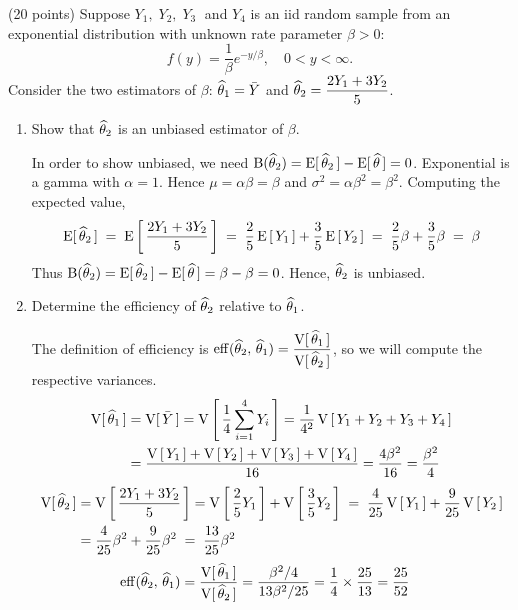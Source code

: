 (20 points) Suppose $Y_1,\; Y_2,\; Y_3\;$ and $Y_4$ is an iid random sample from an exponential distribution with unknown rate parameter $\beta > 0$:
$$f(y) = \dfrac{1}{\beta}e^{-y/\beta}, \quad 0 < y < \infty .$$
Consider the two estimators of $\beta$: $\that_1 = \ybar$ and $\that_2 = \dfrac{2Y_1 + 3Y_2}{5}$.
\begin{enumerate}[label=(\alph*)]
    \item Show that $\that_2$ is an unbiased estimator of $\beta$.
    \begin{mybox}
        In order to show unbiased, we need $\operatorname{B}(\that_2) = \Es{\that_2} - \Es{\that} = 0$. Exponential is a gamma with $\alpha = 1$. Hence $\mu = \alpha \beta = \beta$ and $\sigma^2 = \alpha \beta^2 = \beta^2$. Computing the expected value, 
        $$
            \Es{\that_2} \;=\; \Eb{\dfrac{2Y_1 + 3Y_2}{5}} \;=\; \frac{2}{5}\Eb{Y_1} + \frac35 \Eb{Y_2} \;=\; \frac{2}{5}\beta + \frac35 \beta \;=\; \beta$$
        Thus $\operatorname{B}(\that_2) = \Es{\that_2} - \Es{\that} = \beta - \beta = 0$. Hence, $\that_2$ is unbiased.
    \end{mybox}
\vspace{1.2in}
    \item Determine the efficiency of $\that_2$ relative to $\that_1$.
    \begin{mybox}
        The definition of efficiency is $\eff{\that_2}{\that_1} = \dfrac{\Vs{\that_1}}{\Vs{\that_2}}$, so we will compute the respective variances.
        \begin{align*}
            \Vs{\that_1} &= \Vs{\ybar} = \Vb{\over 4 \sum_{i=1}^4 Y_i} = \over{4^2} \Vb{Y_1 + Y_2 + Y_3 + Y_4} \\ &= \frac{\Vb{Y_1} + \Vb{Y_2} + \Vb{Y_3} + \Vb{Y_4}}{16} = \frac{4\beta^2}{16} = \frac{\beta^2}{4}
        \end{align*}
        \begin{align*}
            \Vs{\that_2} &= \Vb{\dfrac{2Y_1 + 3Y_2}{5}} = \Vb{\frac{2}{5}Y_1} + \Vb{\frac{3}{5}Y_2} \;=\; \frac{4}{25} \Vb{Y_1} + \frac{9}{25}\Vb{Y_2}\\
            &=  \frac{4}{25} \beta^2 + \frac{9}{25}\beta^2 \;=\; \frac{13}{25}\beta^2
        \end{align*}
        \begin{align*}
            \eff{\that_2}{\that_1} &= \dfrac{\Vs{\that_1}}{\Vs{\that_2}} = \dfrac{\beta^2/4}{13\beta^2/25} = \over4 \times \frac{25}{13} = \frac{25}{52}
        \end{align*}
    \end{mybox}


\end{enumerate}
